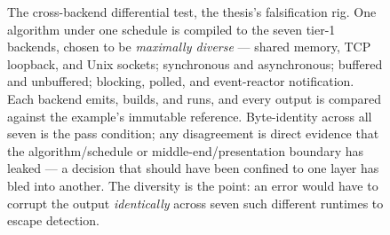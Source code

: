 \begin{figure}[tbp]
  \caption[The bit-identical differential rig]{The cross-backend differential
    test, the thesis's falsification rig. One algorithm under one schedule is
    compiled to the seven tier-1 backends, chosen to be \emph{maximally diverse}
    --- shared memory, TCP loopback, and Unix sockets; synchronous and
    asynchronous; buffered and unbuffered; blocking, polled, and event-reactor
    notification. Each backend emits, builds, and runs, and every output is
    compared against the example's immutable reference. Byte-identity across all
    seven is the pass condition; any disagreement is direct evidence that the
    algorithm/schedule or middle-end/presentation boundary has leaked --- a
    decision that should have been confined to one layer has bled into another.
    The diversity is the point: an error would have to corrupt the output
    \emph{identically} across seven such different runtimes to escape detection.}
  \label{fig:differential-rig}
\end{figure}
